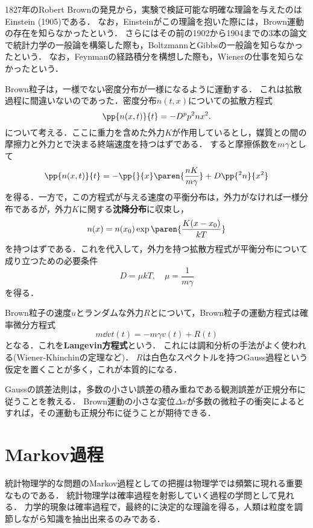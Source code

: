 \documentclass[uplatex,dvipdfmx]{jsreport}
\begin{document}
\begin{history}
    1827年のRobert Brownの発見から，実験で検証可能な明確な理論を与えたのはEinstein (1905)である．
    なお，Einsteinがこの理論を抱いた際には，Brown運動の存在を知らなかったという．
    さらにはその前の1902から1904までの3本の論文で統計力学の一般論を構築した際も，BoltzmannとGibbsの一般論を知らなかったという．
    なお，Feynmanの経路積分を構想した際も，Wienerの仕事を知らなかったという．
\end{history}

\begin{model}[Einsteinの関係式]
    Brown粒子は，一様でない密度分布が一様になるように運動する．
    これは拡散過程に間違いないのであった．密度分布$n(t,x)$についての拡散方程式
    \[\pp{n(x,t)}{t}=-D^pp{^2n}{x^2}.\]
    について考える．ここに重力を含めた外力$K$が作用しているとし，媒質との間の摩擦力と外力とで決まる終端速度を持つはずである．
    すると摩擦係数を$m\gamma$として
    \[\pp{n(x,t)}{t}=-\pp{}{x}\paren{\frac{nK}{m\gamma}}+D\pp{^2n}{x^2}\]
    を得る．一方で，この方程式が与える速度の平衡分布は，外力がなければ一様分布であるが，外力$K$に関する\textbf{沈降分布}に収束し，
    \[n(x)=n(x_0)\exp\paren{\frac{K(x-x_0)}{kT}}\]
    を持つはずである．これを代入して，外力を持つ拡散方程式が平衡分布について成り立つための必要条件
    \[D=\mu kT,\quad\mu=\frac{1}{m\gamma}\]
    を得る．
\end{model}

\begin{model}
    Brown粒子の速度$u$とランダムな外力$R$とについて，Brown粒子の運動方程式は確率微分方程式
    \[m\dd{v}{t}(t)=-m\gamma v(t)+R(t)\]
    となる．これを\textbf{Langevin方程式}という．
    これには調和分析の手法がよく使われる(Wiener-Khinchinの定理など)．
    $R$は白色なスペクトルを持つGauss過程という仮定を置くことが多く，これが本質的になる．
\end{model}

\begin{remarks}
    Gaussの誤差法則は，多数の小さい誤差の積み重ねである観測誤差が正規分布に従うことを教える．
    Brown運動の小さな変位$\Delta x$が多数の微粒子の衝突によるとすれば，その運動も正規分布に従うことが期待できる．
\end{remarks}

\section{Markov過程}

\begin{tcolorbox}[colframe=ForestGreen, colback=ForestGreen!10!white,breakable,colbacktitle=ForestGreen!40!white,coltitle=black,fonttitle=\bfseries\sffamily,
title=]
    統計物理学的な問題のMarkov過程としての把握は物理学では頻繁に現れる重要なものである．
    統計物理学は確率過程を射影していく過程の学問として見れる．
    力学的現象は確率過程で，最終的に決定的な理論を得る，人類は粒度を調節しながら知識を抽出出来るのみである．
\end{tcolorbox}
\end{document}

